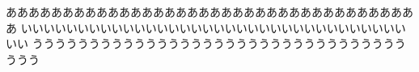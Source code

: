 \documentclass[pdflatex,tate]{jlreq}
\begin{document}
あああああああああああああああああああああああああああああああああああああ
\clearpage
いいいいいいいいいいいいいいいいいいいいいいいいいいいいいいいいいいいい
\clearpage
うううううううううううううううううううううううううううううううううううう
\end{document}
